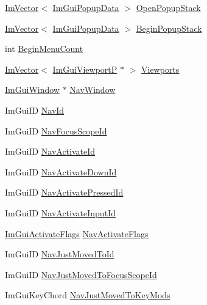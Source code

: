 \begin{DoxyCompactItemize}
\item 
\hyperlink{structImVector}{Im\+Vector}$<$ \hyperlink{structImGuiPopupData}{Im\+Gui\+Popup\+Data} $>$ \hyperlink{structImGuiContext_a0f175fa6d802c77e1c3bda0555bffaef}{Open\+Popup\+Stack}
\item 
\hyperlink{structImVector}{Im\+Vector}$<$ \hyperlink{structImGuiPopupData}{Im\+Gui\+Popup\+Data} $>$ \hyperlink{structImGuiContext_a4f9f576391ae6d84f32ad57ff9ba43ed}{Begin\+Popup\+Stack}
\item 
int \hyperlink{structImGuiContext_a24ba56fe96b392fa230a8f901697f5df}{Begin\+Menu\+Count}
\item 
\hyperlink{structImVector}{Im\+Vector}$<$ \hyperlink{structImGuiViewportP}{Im\+Gui\+ViewportP} $\ast$ $>$ \hyperlink{structImGuiContext_aa8958dc7c05b83d00ad6439f3d539c44}{Viewports}
\item 
\hyperlink{structImGuiWindow}{Im\+Gui\+Window} $\ast$ \hyperlink{structImGuiContext_ae06077e45c894488b28baaf2d7ff8e41}{Nav\+Window}
\item 
Im\+Gui\+ID \hyperlink{structImGuiContext_a0416d655ac426f9923dab220d95a4b6b}{Nav\+Id}
\item 
Im\+Gui\+ID \hyperlink{structImGuiContext_ac286ff64f5d18ec35bb8214825107557}{Nav\+Focus\+Scope\+Id}
\item 
Im\+Gui\+ID \hyperlink{structImGuiContext_a809b5fc440a6198e4266b36150dc3396}{Nav\+Activate\+Id}
\item 
Im\+Gui\+ID \hyperlink{structImGuiContext_a07e49e172b0aad8b1ff2ac3df71b788b}{Nav\+Activate\+Down\+Id}
\item 
Im\+Gui\+ID \hyperlink{structImGuiContext_a24929a88fa69cfb49cfd41c8cb4225d0}{Nav\+Activate\+Pressed\+Id}
\item 
Im\+Gui\+ID \hyperlink{structImGuiContext_a0f8907e7a87f3199f9f07ed41c90e810}{Nav\+Activate\+Input\+Id}
\item 
\hyperlink{imgui__internal_8h_a69818e5784f8f39375ee58059c449ab2}{Im\+Gui\+Activate\+Flags} \hyperlink{structImGuiContext_ae0b1af7b04d34fd89806da19c15e3ca9}{Nav\+Activate\+Flags}
\item 
Im\+Gui\+ID \hyperlink{structImGuiContext_a1ad32892bff3773daf74bf39f525e2c0}{Nav\+Just\+Moved\+To\+Id}
\item 
Im\+Gui\+ID \hyperlink{structImGuiContext_aec90740a5c2a6ab58738e54333ec05cd}{Nav\+Just\+Moved\+To\+Focus\+Scope\+Id}
\item 
Im\+Gui\+Key\+Chord \hyperlink{structImGuiContext_adc549ea338799169bef4c7c8018a53bb}{Nav\+Just\+Moved\+To\+Key\+Mods}
\item 

\end{DoxyCompactItemize}
